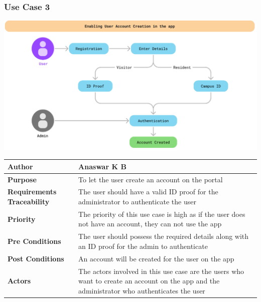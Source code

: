 \documentclass[11pt]{article}
\begin{document}
\subsubsection{Use Case 3}
\begin{center}
\includegraphics*[scale=0.6]{usecase-3.png}\\
\vspace{5mm}
\begin{tabular}{|l|p{10cm}|}
    \hline
    \textbf{Author} & Anaswar K B \\
    \hline
    \textbf{Purpose} &  To let the user create an account on the portal\\
    \hline
    \textbf{Requirements Traceability} & The user should have a valid ID proof for the administrator to authenticate the user\\
    \hline
    \textbf{Priority} & The priority of this use case is high as if the user does not have an account, they can not use the app\\
    \hline
    \textbf{Pre Conditions} &The user should possess the required details along with an ID proof for the admin to authenticate \\
    \hline
    \textbf{Post Conditions} & An account will be created for the user on the app\\
    \hline
    \textbf{Actors} & The actors involved in this use case are the users who want to create an account on the app and the administrator who authenticates the user\\
    \hline
\end{tabular}
\end{center}
\end{document}
